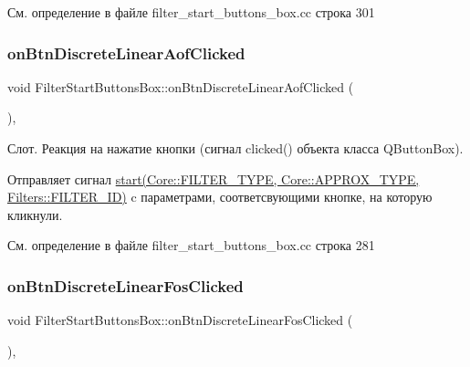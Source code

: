См. определение в файле filter\+\_\+start\+\_\+buttons\+\_\+box.\+cc строка 301

\hypertarget{class_filter_start_buttons_box_ac9e49cc4f6c8d9712c807e1b0711f67a}{}\label{class_filter_start_buttons_box_ac9e49cc4f6c8d9712c807e1b0711f67a} 
\subsubsection{\texorpdfstring{on\+Btn\+Discrete\+Linear\+Aof\+Clicked}{onBtnDiscreteLinearAofClicked}}
{\footnotesize\ttfamily void Filter\+Start\+Buttons\+Box\+::on\+Btn\+Discrete\+Linear\+Aof\+Clicked (\begin{DoxyParamCaption}{ }\end{DoxyParamCaption})\hspace{0.3cm}{\ttfamily [private]}, {\ttfamily [slot]}}

Слот. Реакция на нажатие кнопки (сигнал clicked() объекта класса Q\+Button\+Box).

Отправляет сигнал \hyperlink{class_filter_start_buttons_box_ac6e2a6555f1d388391f188f834b8e753}{start(\+Core\+::\+F\+I\+L\+T\+E\+R\+\_\+\+T\+Y\+P\+E, Core\+::\+A\+P\+P\+R\+O\+X\+\_\+\+T\+Y\+P\+E, Filters\+::\+F\+I\+L\+T\+E\+R\+\_\+\+I\+D)} c параметрами, соответсвующими кнопке, на которую кликнули. 

См. определение в файле filter\+\_\+start\+\_\+buttons\+\_\+box.\+cc строка 281

\hypertarget{class_filter_start_buttons_box_abca20b7c058a4305904912a8e9ea87db}{}\label{class_filter_start_buttons_box_abca20b7c058a4305904912a8e9ea87db} 
\subsubsection{\texorpdfstring{on\+Btn\+Discrete\+Linear\+Fos\+Clicked}{onBtnDiscreteLinearFosClicked}}
{\footnotesize\ttfamily void Filter\+Start\+Buttons\+Box\+::on\+Btn\+Discrete\+Linear\+Fos\+Clicked (\begin{DoxyParamCaption}{ }\end{DoxyParamCaption})\hspace{0.3cm}{\ttfamily [private]}, {\ttfamily [slot]}}

